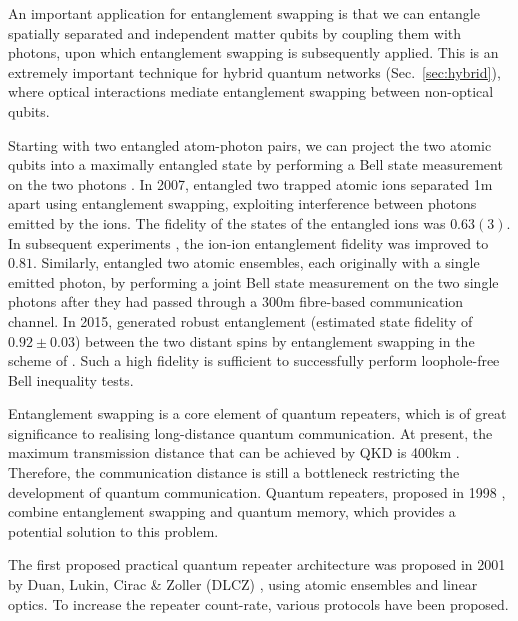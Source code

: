An important application for entanglement swapping is that we can entangle spatially separated and independent matter qubits by coupling them with photons, upon which entanglement swapping is subsequently applied. This is an extremely important technique for hybrid quantum networks (Sec.~\ref{sec:hybrid}), where optical interactions mediate entanglement swapping between non-optical qubits.

Starting with two entangled atom-photon pairs, we can project the two atomic qubits into a maximally entangled state by performing a Bell state measurement on the two photons \cite{bib:blinov2004observation, bib:PRL_96_030404}. In 2007, \cite{bib:Nature_449_68} entangled two trapped atomic ions separated 1m apart using entanglement swapping, exploiting interference between photons emitted by the ions. The fidelity of the states of the entangled ions was $0.63(3)$. In subsequent experiments \cite{bib:PRL_100_150404}, the ion-ion entanglement fidelity was improved to $0.81$. Similarly, \cite{bib:Nature_454_1098} entangled two atomic ensembles, each originally with a single emitted photon, by performing a joint Bell state measurement on the two single photons after they had passed through a 300m fibre-based communication channel. In 2015, \cite{bib:hensen2015loophole} generated robust entanglement (estimated state fidelity of $0.92\pm0.03$) between the two distant spins by entanglement swapping in the scheme of \cite{bib:BarrettKok05, bib:bernien2013heralded}. Such a high fidelity is sufficient to successfully perform loophole-free Bell inequality tests.

Entanglement swapping is a core element of quantum repeaters, which is of great significance to realising long-distance quantum communication. At present, the maximum transmission distance that can be achieved by QKD is 400km \cite{bib:arxiv_1606.06821}. Therefore, the communication distance is still a bottleneck restricting the development of quantum communication. Quantum repeaters, proposed in 1998 \cite{bib:BDCZ98}, combine entanglement swapping and quantum memory, which provides a potential solution to this problem.

The first proposed practical quantum repeater architecture was proposed in 2001 by Duan, Lukin, Cirac \& Zoller (DLCZ) \cite{bib:Duan01}, using atomic ensembles and linear optics. To increase the repeater count-rate, various protocols \cite{bib:RMP_83_33, bib:PRA_79_042340, bib:PRA_92_012307, bib:PRA_81_052311, bib:PRA_81_052329, bib:NP_6_777, bib:MKLLJ14} have been proposed.


